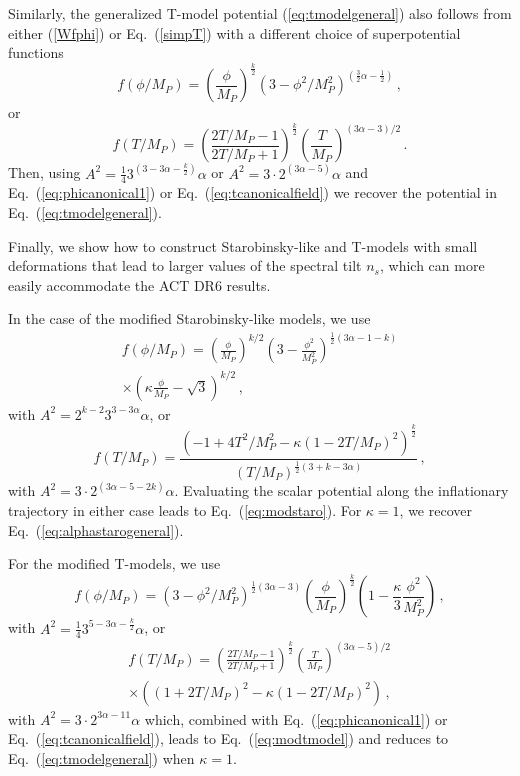 \documentclass[aps,prev,twocolumn,preprintnumbers,floatfix,nofootinbib]{revtex4-1}
\newcommand{\beq}{\begin{equation}}
\newcommand{\eeq}{\end{equation}}
\begin{document}
Similarly, the generalized T-model potential (\ref{eq:tmodelgeneral}) also follows from either (\ref{Wfphi}) or Eq.~(\ref{simpT}) with a different choice of superpotential functions
\beq
f(\phi/M_P) = \left(\frac{\phi}{M_P} \right)^{\frac{k}{2}} (3-\phi^2/M_P^2)^{(\frac32 \alpha - \frac12)} \, ,
\eeq
or
\beq
f(T/M_P) = \left( \frac{2T/M_P-1}{2T/M_P+1} \right)^{\frac{k}{2}} \left(\frac{T}{M_P} \right)^{(3 \alpha -3)/2} \, .
\eeq 
Then, using  $A^2 = \frac14 3^{(3-3\alpha-\frac{k}{2})} \alpha$ or $A^2 = 3 \cdot 2^{(3\alpha-5)} \alpha$ and Eq.~(\ref{eq:phicanonical1}) or Eq.~(\ref{eq:tcanonicalfield}) we recover the potential in Eq.~(\ref{eq:tmodelgeneral}). 



Finally, we show how to construct Starobinsky-like and T-models with small deformations that lead to larger values of the spectral tilt $n_s$, which can more easily accommodate the ACT DR6 results.

In the case of the modified Starobinsky-like models, we use
\beq
\begin{aligned}
f(\phi/M_P) = \left(\frac{\phi}{M_P} \right)^{k/2} \left(3 -\frac{\phi^2}{M_P^2}\right)^{\frac{1}{2}(3\alpha - 1 - k)} \\
\times \left(\kappa \frac{\phi}{M_P} -\sqrt{3}\right)^{k/2} \, ,
\end{aligned}
\eeq
with $A^2 = 2^{k-2} 3^{3-3\alpha} \alpha$, or
\beq
f(T/M_P) = \frac{\left(-1+4 T^2/M_P^2 -\kappa(1-2 T/M_P)^2\right)^{\frac{k}{2}}}{ (T/M_P)^{\frac12(3+k-3\alpha)}} \, ,
\eeq
with $A^2 = 3 \cdot 2^{(3\alpha-5-2k)} \alpha$.
Evaluating the scalar potential along the inflationary trajectory in either case leads to Eq.~(\ref{eq:modstaro}). 
For $\kappa = 1$, we recover Eq.~(\ref{eq:alphastarogeneral}).

For the modified T-models, we use 
\beq
f(\phi/M_P) = \left(3 - \phi^2/M_P^2\right)^{\frac{1}{2}(3\alpha - 3)} \left(\frac{\phi}{M_P}\right)^{\frac{k}{2}}
\left( 1 - \frac{\kappa}{3} \frac{\phi^{2}}{M_P^2} \right)  \, ,
\eeq
with $A^2 = \frac14 3^{5-3 \alpha - \frac{k}{2}} \alpha $, or
\beq
\begin{aligned}
f(T/M_P) = \left( \frac{2T/M_P-1}{2T/M_P+1} \right)^{\frac{k}{2}}\left( \frac{T}{M_P}\right)^{(3 \alpha -5)/2} \\
\times \left( (1+2T/M_P)^2-\kappa (1-2T/M_P)^2 \right) \, ,
\end{aligned}
\eeq
with $A^2 = 3 \cdot 2^{3\alpha -11} \alpha$ which, combined with Eq.~(\ref{eq:phicanonical1}) or Eq.~(\ref{eq:tcanonicalfield}), leads to Eq.~(\ref{eq:modtmodel}) and 
reduces to Eq.~(\ref{eq:tmodelgeneral}) when $\kappa = 1$.
\end{document}
